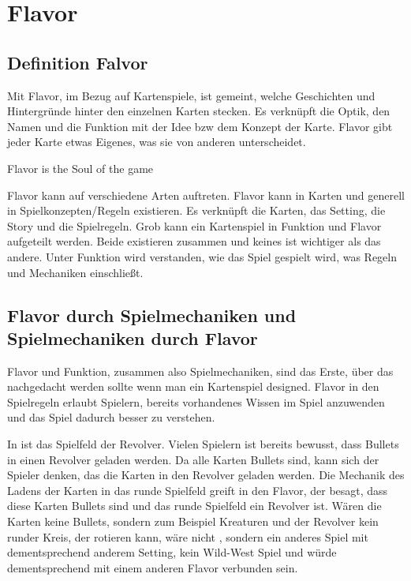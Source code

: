 
\section{Flavor}\label{sec:flavor}

\renewcommand{\kapitelautor}{Autor: Philip Jankovic}

\subsection{Definition Falvor}\label{subsec:wichtigkeit-des-flavours}
%
Mit Flavor, im Bezug auf Kartenspiele, ist gemeint, welche Geschichten und Hintergründe hinter den einzelnen Karten stecken.
Es verknüpft die Optik, den Namen und die Funktion mit der Idee bzw dem Konzept der Karte.
Flavor gibt jeder Karte etwas Eigenes, was sie von anderen unterscheidet.

\begin{coolQuote}
    Flavor is the Soul of the game
\end{coolQuote}

Flavor kann auf verschiedene Arten auftreten. Flavor kann in Karten und generell in Spielkonzepten/Regeln existieren.
Es verknüpft die Karten, das Setting, die Story und die Spielregeln. Grob kann ein Kartenspiel in Funktion und Flavor aufgeteilt werden.
Beide existieren zusammen und keines ist wichtiger als das andere.
Unter Funktion wird verstanden, wie das Spiel gespielt wird, was Regeln und Mechaniken einschließt.


\subsection{Flavor durch Spielmechaniken und Spielmechaniken durch Flavor}

Flavor und Funktion, zusammen also Spielmechaniken, sind das Erste, über das nachgedacht werden sollte wenn man ein Kartenspiel designed.
Flavor in den Spielregeln erlaubt Spielern, bereits vorhandenes Wissen im Spiel anzuwenden und das Spiel dadurch besser zu verstehen. 


In \FF ist das Spielfeld der Revolver. Vielen Spielern ist bereits bewusst, dass Bullets in einen
Revolver geladen werden. Da alle Karten Bullets sind, kann sich der Spieler denken, das die Karten in den Revolver geladen werden. Die Mechanik des Ladens
der Karten in das runde Spielfeld greift in den Flavor, der besagt, dass diese Karten Bullets sind und das runde Spielfeld
ein Revolver ist. Wären die Karten keine Bullets, sondern zum Beispiel Kreaturen und der Revolver kein runder Kreis,
der rotieren kann, wäre \FF nicht \FF, sondern ein anderes Spiel mit dementsprechend anderem Setting, kein Wild-West
Spiel und würde dementsprechend mit einem anderen Flavor verbunden sein.


